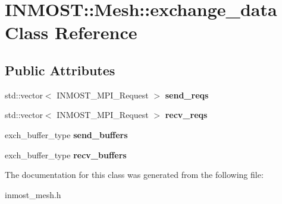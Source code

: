 \hypertarget{classINMOST_1_1Mesh_1_1exchange__data}{\section{I\-N\-M\-O\-S\-T\-:\-:Mesh\-:\-:exchange\-\_\-data Class Reference}
\label{classINMOST_1_1Mesh_1_1exchange__data}
}
\subsection*{Public Attributes}
\begin{DoxyCompactItemize}
\item 
\hypertarget{classINMOST_1_1Mesh_1_1exchange__data_a3fea58fb956043fdaae7cc3dc800388b}{std\-::vector$<$ I\-N\-M\-O\-S\-T\-\_\-\-M\-P\-I\-\_\-\-Request $>$ {\bfseries send\-\_\-reqs}}\label{classINMOST_1_1Mesh_1_1exchange__data_a3fea58fb956043fdaae7cc3dc800388b}

\item 
\hypertarget{classINMOST_1_1Mesh_1_1exchange__data_a00be791ccf06ddf4804c4d49810cc6b1}{std\-::vector$<$ I\-N\-M\-O\-S\-T\-\_\-\-M\-P\-I\-\_\-\-Request $>$ {\bfseries recv\-\_\-reqs}}\label{classINMOST_1_1Mesh_1_1exchange__data_a00be791ccf06ddf4804c4d49810cc6b1}

\item 
\hypertarget{classINMOST_1_1Mesh_1_1exchange__data_ad525f7001a8887563e343812d6499f44}{exch\-\_\-buffer\-\_\-type {\bfseries send\-\_\-buffers}}\label{classINMOST_1_1Mesh_1_1exchange__data_ad525f7001a8887563e343812d6499f44}

\item 
\hypertarget{classINMOST_1_1Mesh_1_1exchange__data_a7353cabbd8acdd79cf069c7b22434f5a}{exch\-\_\-buffer\-\_\-type {\bfseries recv\-\_\-buffers}}\label{classINMOST_1_1Mesh_1_1exchange__data_a7353cabbd8acdd79cf069c7b22434f5a}

\end{DoxyCompactItemize}


The documentation for this class was generated from the following file\-:\begin{DoxyCompactItemize}
\item 
inmost\-\_\-mesh.\-h\end{DoxyCompactItemize}
